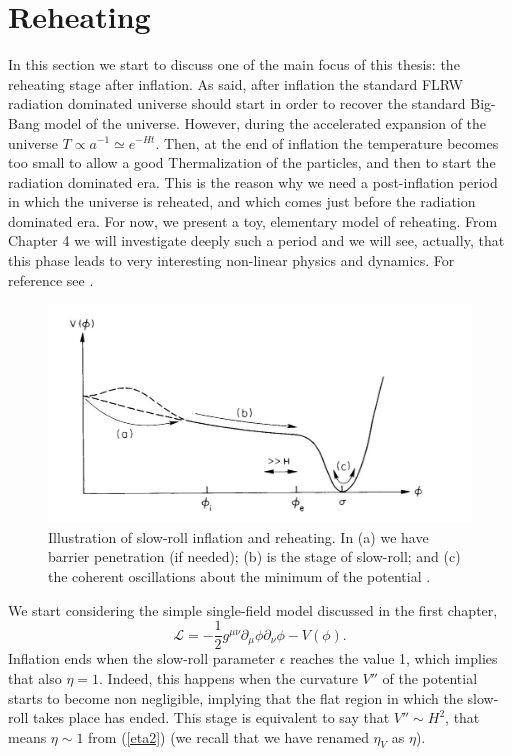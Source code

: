 \documentclass[11pt,a4paper,twoside]{book}
\begin{document}
\section{Reheating}
In this section we start to discuss one of the main focus of this thesis: the reheating stage after inflation.
As said, after  inflation the standard FLRW  radiation dominated universe should start in order to recover the standard Big-Bang model of the universe. However, during the accelerated expansion of the universe $ T \propto a^{-1} \simeq e^{-Ht} $. Then, at the end of inflation the temperature becomes too small to allow a good Thermalization of the particles, and then to start the radiation dominated era. This is the reason why we need a post-inflation period in which the universe is reheated, and which comes just before the radiation dominated era.
For now, we present a toy, elementary model of reheating. From Chapter 4 we will investigate deeply such a period and we will see, actually, that this phase leads to very interesting non-linear physics and dynamics. For reference see \cite{Chap2:Kolb_Turner}.
\begin{figure}
	\centering
	\includegraphics[width=0.8\linewidth, height=0.3\textheight]{Images/Chap1/ReheatingImage}
	\caption{Illustration of slow-roll inflation and reheating. In (a) we have barrier penetration (if needed); (b) is the stage of slow-roll; and (c) the coherent oscillations about the minimum of the potential \cite{Chap2:Kolb_Turner}.}
	\label{fig:reheatingimage}
\end{figure}

We start considering the simple single-field model discussed in the first chapter,
\begin{equation}
		\mathcal{L} = -\dfrac{1}{2} g^{\mu\nu} \partial_{\mu}\phi \partial_{\nu} \phi - V(\phi).
\end{equation}	
Inflation ends when the slow-roll parameter $\epsilon$ reaches the value 1, which implies that also $\eta=1$. Indeed, this happens when the curvature $ V'' $ of the potential starts to become non negligible, implying that the flat region in which the slow-roll takes place has ended. This stage is equivalent to say that $ V''\sim H^{2} $, that means $\eta \sim 1$ from (\ref{eta2}) (we recall that we have renamed $\eta_{V}$ as $\eta$). 
\end{document}
